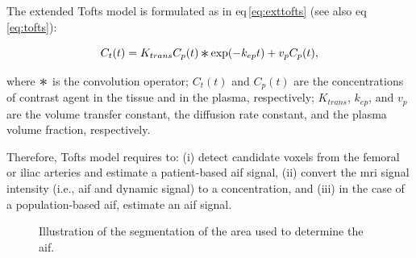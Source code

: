 The extended Tofts model is formulated as in \acs{eq}\,\eqref{eq:exttofts} (see also \acs{eq}\,\eqref{eq:tofts}):

\begin{equation}
  C_t(t) = K_{trans} C_p(t) \Conv \exp(-k_{ep}t) + v_p C_p(t),
  \label{eq:exttofts}
\end{equation}

\noindent where $\Conv$ is the convolution operator; $C_t(t)$ and $C_p(t)$ are the concentrations of contrast agent in the tissue and in the plasma, respectively; $K_{trans}$, $k_{ep}$, and $v_p$ are the volume transfer constant, the diffusion rate constant, and the plasma volume fraction, respectively.

Therefore, Tofts model requires to:
(i) detect candidate voxels from the femoral or iliac arteries and estimate a patient-based \ac{aif} signal,
(ii) convert the \ac{mri} signal intensity (i.e., \ac{aif} and dynamic signal) to a concentration, and
(iii) in the case of a population-based \ac{aif}, estimate an \ac{aif} signal.

\begin{figure}
  \centering
  \hspace*{\fill}
   \hfill
   \hfill
  \hspace*{\fill}
  \caption{Illustration of the segmentation of the area used to determine the \acs*{aif}.}
  \label{fig:aif}
\end{figure}

